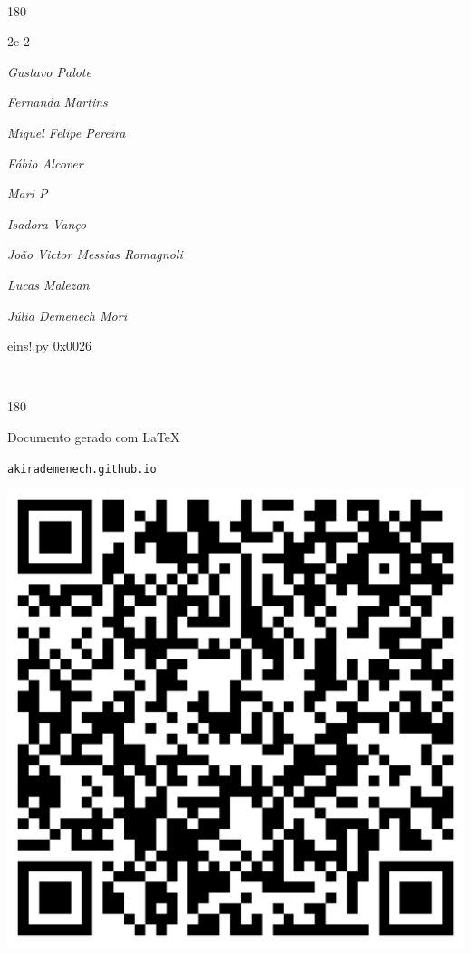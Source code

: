 \documentclass[12pt]{article}
\begin{document}
	\ 
	\vfill
	\begin{turn}{180}	
		\begin{minipage}{\textwidth}
		  	\ttfamily %
			\centering
			{\Huge 2e-2}
		  
			\hfill
		  
			

\textit{\small Gustavo Palote}

\textit{\small Fernanda Martins}

\textit{\small Miguel Felipe Pereira}

\textit{\small Fábio Alcover}

\textit{\small Mari P}

\textit{\small Isadora Vanço}

\textit{\small João Victor Messias Romagnoli}

\textit{\small Lucas Malezan}

\textit{\small Júlia Demenech Mori}

\bigskip

eins!.py
0x0026


		\end{minipage}	
	\end{turn}
	\vfill
	\

\pagebreak

	\begin{turn}{180}	
		\begin{minipage}{\textwidth}		  
		  Documento gerado com \LaTeX			
		  
		  \texttt{akirademenech.github.io}

		  \includegraphics[height=0.3\textheight]{2e-2.pdf}

		\end{minipage}	
	\end{turn}  
		  
\end{document}
